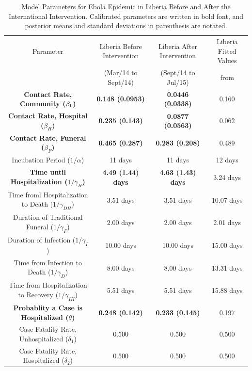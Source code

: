 \begin{table}[ht]
\caption{Model Parameters for Ebola Epidemic in Liberia Before and After the International Intervention. Calibrated parameters are written in bold font, and posterior means and standard deviations in parenthesis are notated.} %
\centering %
\begin{tabular}{c| c| c| c }
\hline\hline %
Parameter & Liberia Before Intervention  & Liberia After Intervention & Liberia Fitted Values\\ [0.5ex]
 & (Mar/14 to Sept/14) &  (Sept/14 to Jul/15) & from \cite{FortmannRoe}\\ [0.5ex] %
\hline %
\bf {Contact Rate, Community  ($\bf{\beta_{I}}$) }& \bf{0.148 (0.0953)} & \bf{0.0446 (0.0338)} & 0.160 \\
\bf Contact Rate, Hospital  ($\beta_{H}$) &\bf 0.235 (0.143)& \bf 0.0877 (0.0563) & 0.062\\
\bf Contact Rate, Funeral  ($\beta_{F}$) & \bf 0.465 (0.287)& \bf 0.283 (0.208) & 0.489 \\
Incubation Period (${1}/{\alpha}$) & 11 days & 11 days  & 12 days\\
\bf Time until Hospitalization (${1}/{\gamma_{H}}$) &\bf 4.49 (1.44) days & \bf 4.63 (1.43) days & 3.24 days  \\
Time froml Hospitalization to Death (${1}/{\gamma_{DH}}$) & 3.51 days & 3.51 days  & 10.07 days\\
Duration of Traditional Funeral (${1}/{\gamma_{F}}$) & 2.00 days & 2.00 days  & 2.01 days\\
Duration of Infection (${1}/{\gamma_{I}}$) & 10.00 days & 10.00 days  & 15.00 days\\
Time from Infection to Death (${1}/{\gamma_{D}}$) & 8.00 days & 8.00 days  & 13.31 days\\
Time from Hospitalization to Recovery (${1}/{\gamma_{IH}}$) & 5.51 days & 5.51 days  & 15.88 days\\
\bf Probablity a Case is Hospitalized ($\theta$) & \bf 0.248 (0.142) & \bf 0.233 (0.145) & 0.197\\
Case Fatality Rate, Unhospitalized ($\delta_{1}$) & 0.500  & 0.500  &  0.500 \\
Case Fatality Rate, Hospitalized ($\delta_{2}$) & 0.500 & 0.500 & 0.500\\ [1ex]
\hline
\end{tabular}
\label{tab:parameters}
\end{table}


